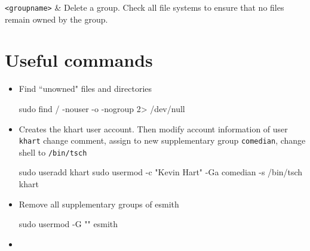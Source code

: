 \verb|<groupname>| & Delete a group. Check all file systems to ensure that no files remain owned by the group.\w
\tableCmdEnd


\section{Useful commands}

\begin{itemize}
\item Find ``unowned" files and directories
\begin{commandshell}
sudo find / -nouser -o -nogroup 2> /dev/null
\end{commandshell}

\item Creates the khart user account. Then modify account information of user \verb|khart| change comment, assign to new supplementary group \verb|comedian|, change shell to \verb|/bin/tsch|
\begin{commandshell}
sudo useradd khart
sudo usermod -c "Kevin Hart" -Ga comedian -s /bin/tsch khart
\end{commandshell}

\item Remove all supplementary groups of esmith
\begin{commandshell}
sudo usermod -G "" esmith
\end{commandshell}

\item 
\end{itemize}